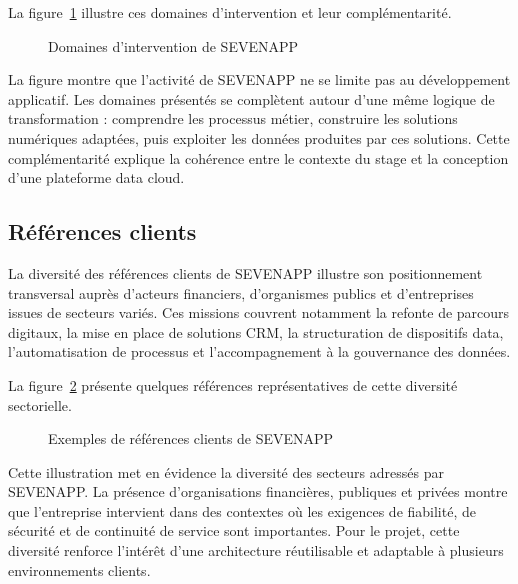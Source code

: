 La figure~\ref{fig:secteurs-activite-seven} illustre ces domaines d'intervention et leur complémentarité.

\begin{figure}[H]
\centering
{\setlength{\fboxsep}{3pt}\setlength{\fboxrule}{0.5pt}%
}
\caption{Domaines d'intervention de SEVENAPP}
\label{fig:secteurs-activite-seven}
\end{figure}

La figure montre que l'activité de SEVENAPP ne se limite pas au développement applicatif. Les domaines présentés se complètent autour d'une même logique de transformation : comprendre les processus métier, construire les solutions numériques adaptées, puis exploiter les données produites par ces solutions. Cette complémentarité explique la cohérence entre le contexte du stage et la conception d'une plateforme data cloud.

\subsection{Références clients}

La diversité des références clients de SEVENAPP illustre son positionnement transversal auprès d'acteurs financiers, d'organismes publics et d'entreprises issues de secteurs variés. Ces missions couvrent notamment la refonte de parcours digitaux, la mise en place de solutions CRM, la structuration de dispositifs data, l'automatisation de processus et l'accompagnement à la gouvernance des données.

La figure~\ref{fig:clients-sevenapp} présente quelques références représentatives de cette diversité sectorielle.

\begin{figure}[H]
\centering
{\setlength{\fboxsep}{3pt}\setlength{\fboxrule}{0.5pt}%
}
\caption{Exemples de références clients de SEVENAPP}
\label{fig:clients-sevenapp}
\end{figure}

Cette illustration met en évidence la diversité des secteurs adressés par SEVENAPP. La présence d'organisations financières, publiques et privées montre que l'entreprise intervient dans des contextes où les exigences de fiabilité, de sécurité et de continuité de service sont importantes. Pour le projet, cette diversité renforce l'intérêt d'une architecture réutilisable et adaptable à plusieurs environnements clients.

